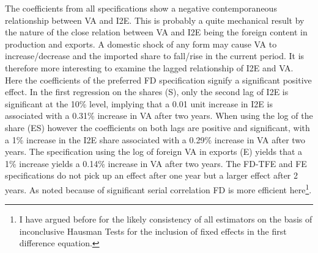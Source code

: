 \documentclass[a4paper]{article}
\begin{document}
The coefficients from all specifications show a negative contemporaneous relationship between VA and I2E. This is probably a quite mechanical result by the nature of the close relation between VA and I2E being the foreign content in production and exports. A domestic shock of any form may cause VA to increase/decrease and the imported share to fall/rise in the current period. It is therefore more interesting to examine the lagged relationship of I2E and VA. Here the coefficients of the preferred FD specification signify a significant positive effect. In the first regression on the shares (S), only the second lag of I2E is significant at the 10\% level, implying that a 0.01 unit increase in I2E is associated with a 0.31\% increase in VA after two years. When using the log of the share (ES) however the coefficients on both lags are positive and significant, with a 1\% increase in the I2E share associated with a  0.29\% increase in VA after two years. The specification using the log of foreign VA in exports (E) yields that a 1\% increase yields a 0.14\% increase in VA after two years. The FD-TFE and FE specifications do not pick up an effect after one year but a larger effect after 2 years. As noted because of significant serial correlation FD is more efficient here\footnote{I have argued before for the likely consistency of all estimators on the basis of inconclusive Hausman Tests for the inclusion of fixed effects in the first difference equation.}.    %
\end{document}
